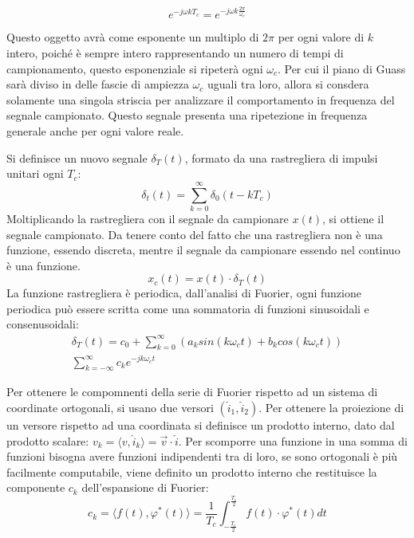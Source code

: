 \documentclass{article}
\numberwithin{equation}{subsection}
\begin{document}
\begin{equation}
    e^{-j\omega kT_c}=e^{-j\omega k\frac{2\pi}{\omega_c}}
\end{equation}

Questo oggetto avrà come esponente un multiplo di $2\pi$ per ogni valore di $k$ intero, poiché è sempre intero rappresentando un numero di tempi di campionamento, questo 
esponenziale si ripeterà ogni $\omega_c$. Per cui il piano di Guass sarà diviso in delle fascie di ampiezza $\omega_c$ uguali tra loro, allora si consdera solamente 
una singola striscia per analizzare il comportamento in frequenza del segnale campionato. Questo segnale presenta una ripetezione in frequenza generale anche 
per ogni valore reale. 

\begin{center}
    \begin{tikzpicture}
        
    \end{tikzpicture}
\end{center}

Si definisce un nuovo segnale $\delta_T(t)$, formato da una rastregliera di impulsi unitari ogni $T_c$:
\begin{equation}
    \delta_t(t)=\sum_{k=0}^{\infty}\delta_0(t-kT_c)
\end{equation} 
Moltiplicando la rastregliera con il segnale da campionare $x(t)$, si ottiene il segnale campionato. Da tenere conto del fatto che una rastregliera non è una funzione, 
essendo discreta, mentre il segnale da campionare essendo nel continuo è una funzione. 
\begin{equation}
    x_c(t)=x(t)\cdot\delta_T(t)
\end{equation}
La funzione rastregliera è periodica, dall'analisi di Fuorier, ogni funzione periodica può essere scritta come una sommatoria di funzioni sinusoidali e consenusoidali:
\begin{gather}
    \delta_T(t)=c_0+\sum_{k=0}^{\infty}\left(a_ksin(k\omega_ct)+b_kcos(k\omega_ct)\right)\\
    \sum_{k=-\infty}^{\infty}c_ke^{-jk\omega_ct}
\end{gather}

Per ottenere le compomnenti della serie di Fuorier rispetto ad un sistema di coordinate ortogonali, si usano due versori $(\hat{i}_1,\hat{i}_2)$. Per ottenere la 
proiezione di un versore rispetto ad una coordinata si definisce un prodotto interno, dato dal prodotto scalare: $v_k=\langle v,\hat{i}_k\rangle=\vec{v}\cdot\hat{i}$. 
Per scomporre una funzione in una somma di funzioni bisogna avere funzioni indipendenti tra di loro, se sono ortogonali è più facilmente computabile, viene 
definito un prodotto interno che restituisce la componente $c_k$ dell'espansione di Fuorier:
\begin{equation}
    c_k=\langle f(t), \varphi^*(t)\rangle=\displaystyle\frac{1}{T_c}\int_{-\frac{T_c}{2}}^{\frac{T_c}{2}}f(t)\cdot\varphi^*(t)dt
\end{equation}
\end{document}
